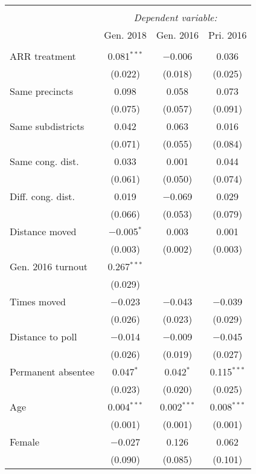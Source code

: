 
\begin{tabular}{@{\extracolsep{5pt}}lccc} 
\\[-1.8ex]\hline 
\hline \\[-1.8ex] 
 & \multicolumn{3}{c}{\textit{Dependent variable:}} \\ 
\cline{2-4} 
 & Gen. 2018 & Gen. 2016 & Pri. 2016 \\ 
\hline \\[-1.8ex] 
 ARR treatment & 0.081$^{***}$ & $-$0.006 & 0.036 \\ 
  & (0.022) & (0.018) & (0.025) \\ 
  Same precincts & 0.098 & 0.058 & 0.073 \\ 
  & (0.075) & (0.057) & (0.091) \\ 
  Same subdistricts & 0.042 & 0.063 & 0.016 \\ 
  & (0.071) & (0.055) & (0.084) \\ 
  Same cong. dist. & 0.033 & 0.001 & 0.044 \\ 
  & (0.061) & (0.050) & (0.074) \\ 
  Diff. cong. dist. & 0.019 & $-$0.069 & 0.029 \\ 
  & (0.066) & (0.053) & (0.079) \\ 
  Distance moved & $-$0.005$^{*}$ & 0.003 & 0.001 \\ 
  & (0.003) & (0.002) & (0.003) \\ 
  Gen. 2016 turnout & 0.267$^{***}$ &  &  \\ 
  & (0.029) &  &  \\ 
  Times moved & $-$0.023 & $-$0.043 & $-$0.039 \\ 
  & (0.026) & (0.023) & (0.029) \\ 
  Distance to poll & $-$0.014 & $-$0.009 & $-$0.045 \\ 
  & (0.026) & (0.019) & (0.027) \\ 
  Permanent absentee & 0.047$^{*}$ & 0.042$^{*}$ & 0.115$^{***}$ \\ 
  & (0.023) & (0.020) & (0.025) \\ 
  Age & 0.004$^{***}$ & 0.002$^{***}$ & 0.008$^{***}$ \\ 
  & (0.001) & (0.001) & (0.001) \\ 
  Female & $-$0.027 & 0.126 & 0.062 \\ 
  & (0.090) & (0.085) & (0.101) \\ 

\end{tabular}
